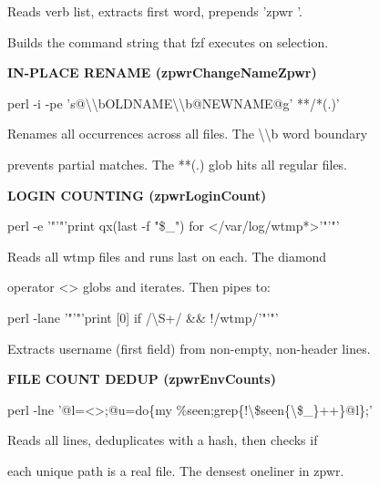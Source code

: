\documentclass[11pt,a4paper,twoside]{book}
\begin{document}
Reads verb list, extracts first word, prepends 'zpwr '.

Builds the command string that fzf executes on selection.


\vspace{12pt}
{\bfseries\color{neonyellow} IN-PLACE RENAME (zpwrChangeNameZpwr)}\vspace{4pt}

\begin{codebox}
perl -i -pe 's@\textbackslash{}\textbackslash{}bOLDNAME\textbackslash{}\textbackslash{}b@NEWNAME@g' **/*(.)'\\
\end{codebox}

Renames all occurrences across all files. The \textbackslash{}\textbackslash{}b word boundary

prevents partial matches. The **(.) glob hits all regular files.


\vspace{12pt}
{\bfseries\color{neonyellow} LOGIN COUNTING (zpwrLoginCount)}\vspace{4pt}

\begin{codebox}
perl -e '"'"'print qx(last -f "\$\_") for </var/log/wtmp*>'"'"'\\
\end{codebox}

Reads all wtmp files and runs last on each. The diamond

operator <> globs and iterates. Then pipes to:

\begin{codebox}
perl -lane '"'"'print [0] if /\textbackslash{}S+/ \&\& !/wtmp/'"'"'\\
\end{codebox}

Extracts username (first field) from non-empty, non-header lines.


\vspace{12pt}
{\bfseries\color{neonyellow} FILE COUNT DEDUP (zpwrEnvCounts)}\vspace{4pt}

\begin{codebox}
perl -lne '@l=<>;@u=do\{my \%seen;grep\{!\textbackslash{}\$seen\{\textbackslash{}\$\_\}++\}@l\};'\\
\end{codebox}

Reads all lines, deduplicates with a hash, then checks if

each unique path is a real file. The densest oneliner in zpwr.
\end{document}

